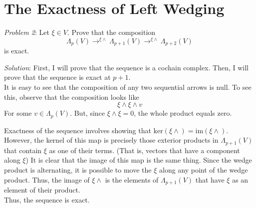 \section{The Exactness of Left Wedging}

\emph{Problem 2}: Let $\xi \in V$. Prove that the composition
\[
\Lambda_p(V) \to^{\xi\wedge} \Lambda_{p+1}(V) \to^{\xi\wedge} \Lambda_{p+2}(V) 
\]
is exact.

\emph{Solution}: First, I will prove that the sequence is a cochain complex.
Then, I will prove that the sequence is exact at $p+1$.
\\
It is easy to see that the composition of any two sequential arrows is null. To
see this, observe that the composition looks like
\[
\xi\wedge\xi\wedge v
\]
For some $v\in \Lambda_p(V)$. But, since $\xi\wedge\xi=0$, the whole product
equals zero.
\par
Exactness of the sequence involves showing that
$\text{ker}(\xi\wedge) = \text{im}(\xi\wedge)$.
However, the kernel of this map is precisely those exterior products in
$\Lambda_{p+1}(V)$ that contain $\xi$ as one of their terms. (That is, vectors
that have a component along $\xi$) It is clear that
the image of this map is the same thing. Since the wedge product is alternating,
it is possible to move the $\xi$ along any point of the wedge product. Thus, the
image of $\xi\wedge$ is the elements of $\Lambda_{p+1}(V)$ that have $\xi$ as an
element of their product.
\\
Thus, the sequence is exact.
